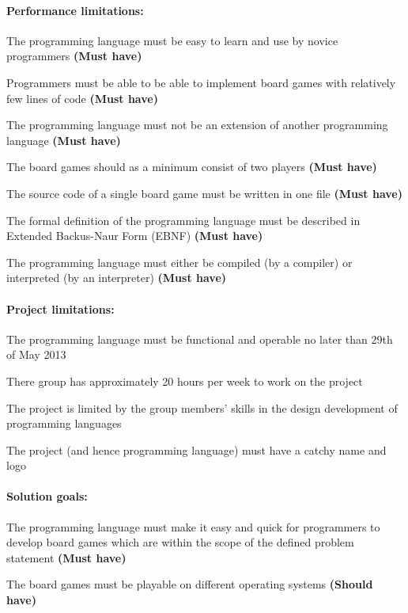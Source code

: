 \paragraph*{Performance limitations:}
\begin{dlist}
  \item The programming language must be easy to learn and use by novice programmers \textbf{(Must have)}
  \item Programmers must be able to be able to implement board games with relatively few lines of code \textbf{(Must have)}
  \item The programming language must not be an extension of another programming language \textbf{(Must have)}
  \item The board games should as a minimum consist of two players \textbf{(Must have)}
  \item The source code of a single board game must be written in one file \textbf{(Must have)}
  \item The formal definition of the programming language must be described in Extended Backus-Naur Form (EBNF) \textbf{(Must have)}
  \item The programming language must either be compiled (by a compiler) or interpreted (by an interpreter) \textbf{(Must have)}
\end{dlist}

\paragraph*{Project limitations:}
\begin{dlist}
  \item The programming language must be functional and operable no later than 29th of May 2013
  \item There group has approximately 20 hours per week to work on the project 
  \item The project is limited by the group members' skills in the design development of programming languages
  \item The project (and hence programming language) must have a catchy name and logo
\end{dlist}

\paragraph*{Solution goals:}
\begin{dlist}
  \item The programming language must make it easy and quick for programmers to develop board games which are within the scope of the defined problem statement \textbf{(Must have)}
  \item The board games must be playable on different operating systems \textbf{(Should have)}
\end{dlist}


